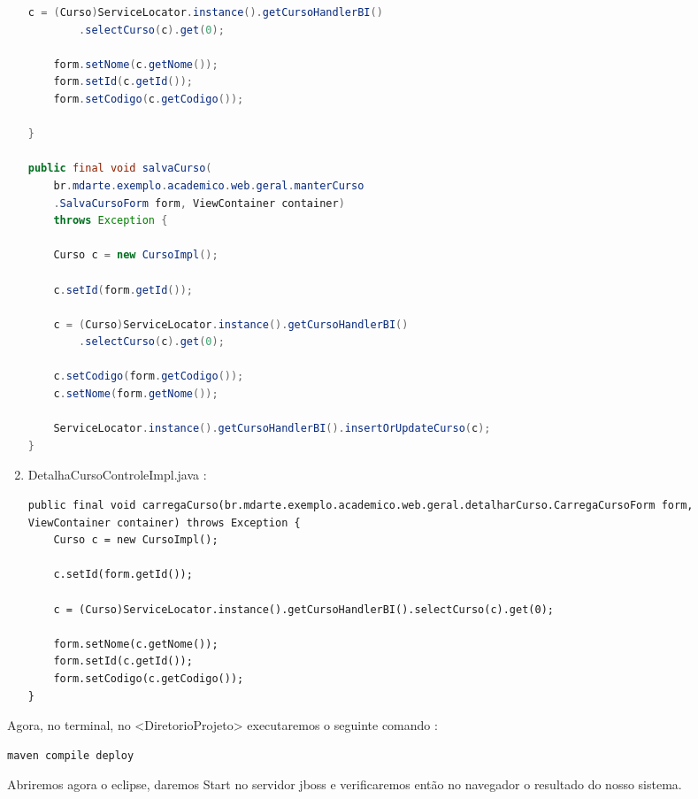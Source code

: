 \begin{enumerate}
\begin{lstlisting}[language=java]
   	c = (Curso)ServiceLocator.instance().getCursoHandlerBI()
   		.selectCurso(c).get(0);
    	
   	form.setNome(c.getNome());
   	form.setId(c.getId());
   	form.setCodigo(c.getCodigo());
    	
}

public final void salvaCurso(
	br.mdarte.exemplo.academico.web.geral.manterCurso
	.SalvaCursoForm form, ViewContainer container)
	throws Exception {

   	Curso c = new CursoImpl();
    	
   	c.setId(form.getId());
    	
   	c = (Curso)ServiceLocator.instance().getCursoHandlerBI()
   		.selectCurso(c).get(0);
    	
	c.setCodigo(form.getCodigo()); 
	c.setNome(form.getNome());

	ServiceLocator.instance().getCursoHandlerBI().insertOrUpdateCurso(c);
}
\end{lstlisting}

\item DetalhaCursoControleImpl.java :
\begin{lstlisting}
public final void carregaCurso(br.mdarte.exemplo.academico.web.geral.detalharCurso.CarregaCursoForm form, ViewContainer container) throws Exception {
	Curso c = new CursoImpl();
    	
    c.setId(form.getId());
    	
    c = (Curso)ServiceLocator.instance().getCursoHandlerBI().selectCurso(c).get(0);

    form.setNome(c.getNome());
    form.setId(c.getId());
    form.setCodigo(c.getCodigo());	
}
\end{lstlisting}
\end{enumerate}

Agora, no terminal, no <DiretorioProjeto> executaremos o seguinte comando :
\begin{lstlisting}[language=bash]
maven compile deploy
\end{lstlisting}

Abriremos agora o eclipse, daremos Start no servidor jboss e verificaremos então
no navegador o resultado do nosso sistema.
